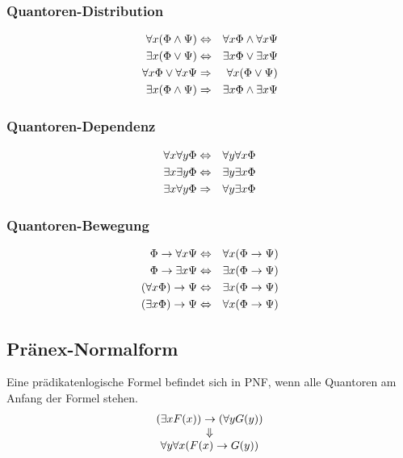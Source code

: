 \documentclass[a4paper,twoside,DIV15,BCOR12mm]{scrbook}
\begin{document}
\subsubsection{Quantoren-Distribution}
\begin{eqnarray*}
	\forall x (\Phi \wedge \Psi)       & \Leftrightarrow   & \forall x \Phi \wedge \forall x \Psi \\
	\exists x (\Phi \vee \Psi)         & \Leftrightarrow   & \exists x \Phi \vee \exists x \Psi \\
	\forall x \Phi \vee \forall x \Psi & \Rightarrow & \forall x (\Phi \vee \Psi) \\
	\exists x (\Phi \wedge \Psi)       & \Rightarrow & \exists x \Phi \wedge \exists x \Psi
\end{eqnarray*}

\subsubsection{Quantoren-Dependenz}
\begin{eqnarray*}
	\forall x \forall y \Phi & \Leftrightarrow   & \forall y \forall x \Phi \\
	\exists x \exists y \Phi & \Leftrightarrow   & \exists y \exists x \Phi \\
	\exists x \forall y \Phi & \Rightarrow & \forall y \exists x \Phi 
\end{eqnarray*}

\subsubsection{Quantoren-Bewegung}
\begin{eqnarray*}
	\Phi \rightarrow \forall x \Psi & \Leftrightarrow & \forall x (\Phi \rightarrow \Psi) \\
	\Phi \rightarrow \exists x \Psi & \Leftrightarrow & \exists x (\Phi \rightarrow \Psi) \\
	(\forall x \Phi) \rightarrow \Psi & \Leftrightarrow & \exists x (\Phi \rightarrow \Psi) \\
	(\exists x \Phi) \rightarrow \Psi & \Leftrightarrow & \forall x (\Phi \rightarrow \Psi) 
\end{eqnarray*}

\subsection{Pränex-Normalform}
Eine prädikatenlogische Formel befindet sich in PNF, wenn alle Quantoren am Anfang der Formel stehen.
$$\begin{array}{c}
	(\exists x F(x)) \rightarrow (\forall y G(y)) \\
	\Downarrow\\
	\forall y \forall x (F(x) \rightarrow G(y))
\end{array}$$
\end{document}
